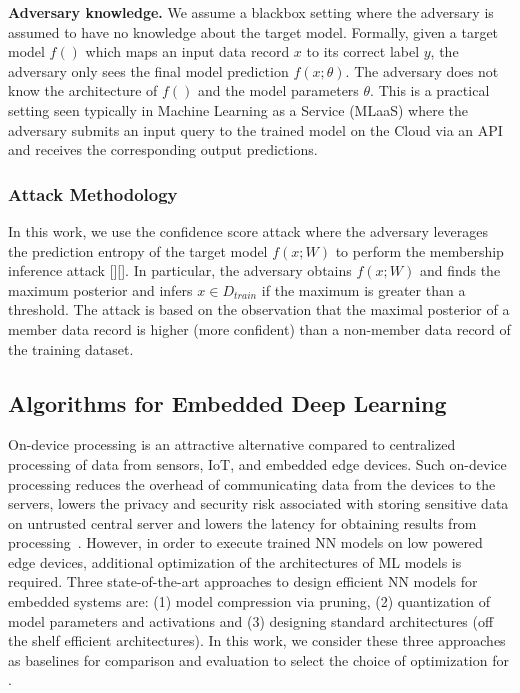 \noindent\textbf{Adversary knowledge.} We assume a blackbox setting where the adversary is assumed to have no knowledge about the target model.
Formally, given a target model $f()$ which maps an input data record $x$ to its correct label $y$, the adversary only sees the final model prediction $f(x;\theta)$.
The adversary does not know the architecture of $f()$ and the model parameters $\theta$.
This is a practical setting seen typically in Machine Learning as a Service (MLaaS) where the adversary submits an input query to the trained model on the Cloud via an API and receives the corresponding output predictions.


\subsubsection{Attack Methodology}
In this work, we use the confidence score attack where the adversary leverages the prediction entropy of the target model $f(x;W)$ to perform the membership inference attack [][].
In particular, the adversary obtains $f(x;W)$ and finds the maximum posterior and infers $x \in D_{train}$ if the maximum is greater than a threshold.
The attack is based on the observation that the maximal posterior of a member data record is higher (more confident) than a non-member data record of the training dataset.



\subsection{Algorithms for Embedded Deep Learning}

On-device processing is an attractive alternative compared to centralized processing of data from sensors, IoT, and embedded edge devices.
Such on-device processing reduces the overhead of communicating data from the devices to the servers, lowers the privacy and security risk associated with storing sensitive data on untrusted central server and lowers the latency for obtaining results from processing~\cite{}.
However, in order to execute trained NN models on low powered edge devices, additional optimization of the architectures of ML models is required.
Three state-of-the-art approaches to design efficient NN models for embedded systems are: (1) model compression via pruning, (2) quantization of model parameters and activations and (3) designing standard architectures (off the shelf efficient architectures).
In this work, we consider these three approaches as baselines for comparison and evaluation to select the choice of optimization for \method.

